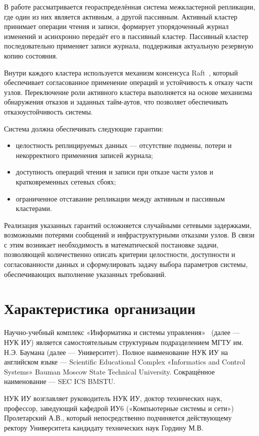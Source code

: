 
В работе рассматривается геораспределённая система межкластерной
репликации, где один из них является активным, а другой пассивным.
Активный кластер принимает операции чтения и записи,
формирует упорядоченный журнал изменений
и асинхронно передаёт его в пассивный кластер.
Пассивный кластер последовательно применяет записи журнала,
поддерживая актуальную резервную копию состояния.

Внутри каждого кластера используется механизм консенсуса Raft~\cite{raft},
который обеспечивает согласованное применение операций
и устойчивость к отказу части узлов.
Переключение роли активного кластера выполняется
на основе механизма обнаружения отказов
и заданных тайм-аутов,
что позволяет обеспечивать отказоустойчивость системы.

Система должна обеспечивать следующие гарантии:
\begin{itemize}
\item целостность реплицируемых данных —
отсутствие подмены, потери и некорректного применения записей журнала;
\item доступность операций чтения и записи
при отказе части узлов и кратковременных сетевых сбоях;
\item ограниченное отставание репликации между активным и пассивным кластерами.
\end{itemize}

Реализация указанных гарантий осложняется
случайными сетевыми задержками,
возможными потерями сообщений
и инфраструктурными отказами узлов.
В связи с этим возникает необходимость
в математической постановке задачи,
позволяющей количественно описать критерии
целостности, доступности и согласованности данных
и сформулировать задачу выбора параметров системы,
обеспечивающих выполнение указанных требований.

\section{Характеристика организации}

Научно-учебный комплекс «Информатика и системы управления»~\cite{BMSTU_IU}
(далее — НУК ИУ) является самостоятельным структурным подразделением
МГТУ им. Н.Э. Баумана (далее — Университет).
Полное наименование НУК ИУ на английском языке —
Scientific Educational Complex «Informatics and Control Systems»
Bauman Moscow State Technical University.
Сокращённое наименование — SEC ICS BMSTU.

НУК ИУ возглавляет руководитель НУК ИУ,
доктор технических наук, профессор,
заведующий кафедрой ИУ6 («Компьютерные системы и сети»)
Пролетарский А.В.,
который непосредственно подчиняется
действующему ректору Университета
кандидату технических наук Гордину М.В.

